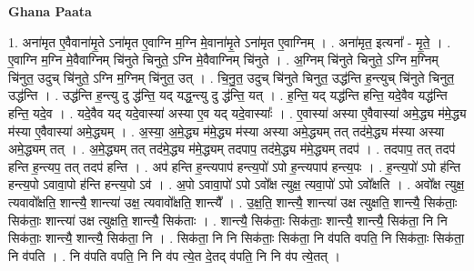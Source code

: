 \documentclass[17pt]{extarticle}
\begin{document}
\textbf{Ghana Paata } \newline

1. अना॑मृत ए॒वैवाना॑मृ॒ते ऽना॑मृत ए॒वाग्नि म॒ग्नि मे॒वाना॑मृ॒ते ऽना॑मृत ए॒वाग्निम् । . अना॑मृत॒ इत्यना᳚ - मृ॒ते॒ । . ए॒वाग्नि म॒ग्नि मे॒वैवाग्निम् चि॑नुते चिनुते॒ ऽग्नि मे॒वैवाग्निम् चि॑नुते । . अ॒ग्निम् चि॑नुते चिनुते॒ ऽग्नि म॒ग्निम् चि॑नुत॒ उदुच् चि॑नुते॒ ऽग्नि म॒ग्निम् चि॑नुत॒ उत् । . चि॒नु॒त॒ उदुच् चि॑नुते चिनुत॒ उद्ध॑न्ति ह॒न्त्युच् चि॑नुते चिनुत॒ उद्ध॑न्ति । . उद्ध॑न्ति ह॒न्त्यु दु द्ध॑न्ति॒ यद् यद्ध॒न्त्यु दु द्ध॑न्ति॒ यत् । . ह॒न्ति॒ यद् यद्ध॑न्ति हन्ति॒ यदे॒वैव यद्ध॑न्ति हन्ति॒ यदे॒व । . यदे॒वैव यद् यदे॒वास्या॑ अस्या ए॒व यद् यदे॒वास्याः᳚ । . ए॒वास्या॑ अस्या ए॒वैवास्या॑ अमे॒द्ध्य म॑मे॒द्ध्य म॑स्या ए॒वैवास्या॑ अमे॒द्ध्यम् । . अ॒स्या॒ अ॒मे॒द्ध्य म॑मे॒द्ध्य म॑स्या अस्या अमे॒द्ध्यम् तत् तद॑मे॒द्ध्य म॑स्या अस्या अमे॒द्ध्यम् तत् । . अ॒मे॒द्ध्यम् तत् तद॑मे॒द्ध्य म॑मे॒द्ध्यम् तदपाप॒ तद॑मे॒द्ध्य म॑मे॒द्ध्यम् तदप॑ । . तदपाप॒ तत् तदप॑ हन्ति ह॒न्त्यप॒ तत् तदप॑ हन्ति । . अप॑ हन्ति ह॒न्त्यपाप॑ हन्त्य॒पो॑ ऽपो ह॒न्त्यपाप॑ हन्त्य॒पः । . ह॒न्त्य॒पो॑ ऽपो ह॑न्ति हन्त्य॒पो ऽवावा॒पो ह॑न्ति हन्त्य॒पो ऽव॑ । . अ॒पो ऽवावा॒पो॑ ऽपो ऽवो᳚क्ष त्युक्ष॒ त्यवा॒पो॑ ऽपो ऽवो᳚क्षति । . अवो᳚क्ष त्युक्ष॒ त्यवावो᳚क्षति॒ शान्त्यै॒ शान्त्या॑ उक्ष॒ त्यवावो᳚क्षति॒ शान्त्यै᳚ । . उ॒क्ष॒ति॒ शान्त्यै॒ शान्त्या॑ उक्ष त्युक्षति॒ शान्त्यै॒ सिक॑ताः॒ सिक॑ताः॒ शान्त्या॑ उक्ष त्युक्षति॒ शान्त्यै॒ सिक॑ताः । . शान्त्यै॒ सिक॑ताः॒ सिक॑ताः॒ शान्त्यै॒ शान्त्यै॒ सिक॑ता॒ नि नि सिक॑ताः॒ शान्त्यै॒ शान्त्यै॒ सिक॑ता॒ नि । . सिक॑ता॒ नि नि सिक॑ताः॒ सिक॑ता॒ नि व॑पति वपति॒ नि सिक॑ताः॒ सिक॑ता॒ नि व॑पति । . नि व॑पति वपति॒ नि नि व॑प त्ये॒त दे॒तद् व॑पति॒ नि नि व॑प त्ये॒तत् । \newline
\end{document}
